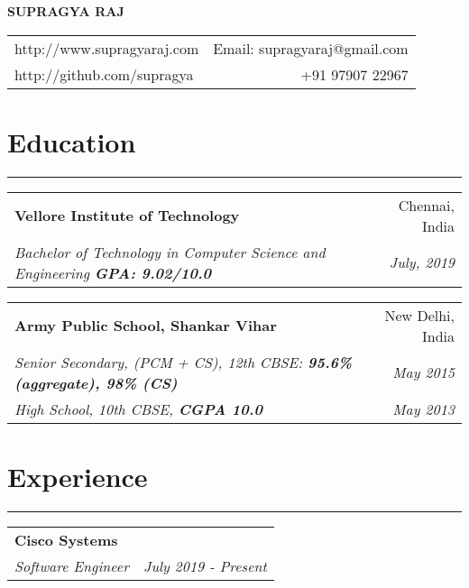 \documentclass[a4paper,6pt]{article}
\begin{document}
\begin{center}
\Large \textbf{SUPRAGYA RAJ}


\end{center}
\begin{tabularx}{\textwidth}{X r}
	http://www.supragyaraj.com & Email: supragyaraj@gmail.com \\
	http://github.com/supragya & +91 97907 22967 
\end{tabularx}


\section*{Education}
\vspace{-8px}
\hrule
\vspace{4px}
\hspace{5px}
\begin{tabularx}{\textwidth}{X r}
	\textbf{Vellore Institute of Technology} & Chennai, India \\
	\textit{\small Bachelor of Technology in Computer Science and Engineering \textcolor{mygray}{\textbf{GPA: 9.02/10.0}}} & \textit{July, 2019} 
\end{tabularx}

\hspace{5px}
\begin{tabularx}{\textwidth}{X r}
	\textbf{Army Public School, Shankar Vihar} & New Delhi, India \\
	\textit{\small Senior Secondary, (PCM + CS), 12th CBSE:  \textcolor{mygray}{\textbf{95.6\% (aggregate), 98\% (CS)}}} & \textit{May 2015} \\
	\textit{\small High School, 10th CBSE, \textcolor{mygray}{\textbf{CGPA 10.0}}} & \textit{May 2013}
\end{tabularx}

\vspace{-9px}
\section*{Experience}
\vspace{-8px}
\hrule

\vspace{4px}
\hspace{5px}
\begin{tabularx}{\textwidth}{X r}
	\large{\textbf{Cisco Systems}} & \\
	\textit{\small Software Engineer} & \textit{July 2019 - Present} \\
\end{tabularx}
\end{document}
